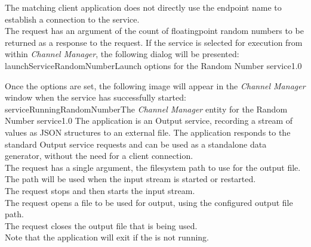 \insertAutoAppParameters
{}
The matching client application does not directly use the endpoint name to establish a
connection to the service.\\

The  request has an argument of the
count of floating\longDash{}point random numbers to be returned as a response to the
request.
%
\condPage
If the service is selected for execution from within \emph{Channel Manager}, the following
dialog will be presented:
%
{launchServiceRandomNumber}{Launch options for the Random Number service}{1.0}

Once the options are set, the following image will appear in the \emph{Channel Manager}
window when the service has successfully started:
%
{serviceRunningRandomNumber}{The \emph{Channel Manager} entity for the Random Number
service}{1.0}
\condPage
{}
The  application is an Output
service, recording a stream of \yarp{} values as JSON structures to an external file.
The application responds to the standard Output service requests and can be used as a
standalone data generator, without the need for a client connection.\\

The  request has a single argument,
the file\longDash{}system path to use for the output file.
The path will be used when the input stream is started or restarted.\\

The  request stops and then
starts the input stream.\\

The  request opens a file to be
used for output, using the configured output file path.\\

The  request closes the output
file that is being used.\\

Note that the application will exit if the
 is not running.\\

